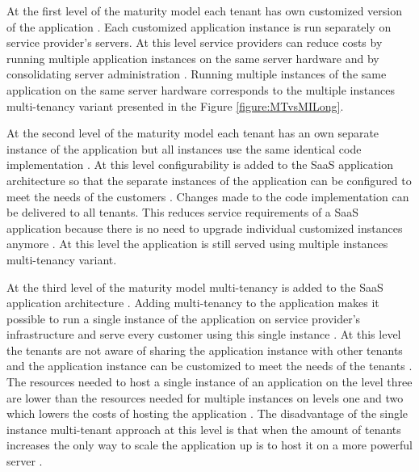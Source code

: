 \documentclass[conference]{sasmoota2017}
\begin{document}
At the first level of the maturity model each tenant has own customized version of the application \cite{Carraro:2006:ArchitectureLongTail}. Each customized application instance is run separately on service provider's servers. At this level service providers can reduce costs by running multiple application instances on the same server hardware and by consolidating server administration \cite{Carraro:2006:ArchitectureLongTail}. Running multiple instances of the same application on the same server hardware corresponds to the multiple instances multi-tenancy variant presented in the Figure \ref{figure:MTvsMILong}. 

At the second level of the maturity model each tenant has an own separate instance of the application but all instances use the same identical code implementation \cite{Carraro:2006:ArchitectureLongTail}. At this level configurability is added to the SaaS application architecture so that the separate instances of the application can be configured to meet the needs of the customers \cite{Carraro:2006:ArchitectureLongTail}. Changes made to the code implementation can be delivered to all tenants. This reduces service requirements of a SaaS application because there is no need to upgrade individual customized instances anymore \cite{Carraro:2006:ArchitectureLongTail}. At this level the application is still served using multiple instances multi-tenancy variant.

At the third level of the maturity model multi-tenancy is added to the SaaS application architecture \cite{Carraro:2006:ArchitectureLongTail}. Adding multi-tenancy to the application makes it possible to run a single instance of the application on service provider's infrastructure and serve every customer using this single instance \cite{Carraro:2006:ArchitectureLongTail}. At this level the tenants are not aware of sharing the application instance with other tenants and the application instance can be customized to meet the needs of the tenants \cite{Carraro:2006:ArchitectureLongTail}. The resources needed to host a single instance of an application on the level three are lower than the resources needed for multiple instances on levels one and two which lowers the costs of hosting the application \cite{Carraro:2006:ArchitectureLongTail}. The disadvantage of the single instance multi-tenant approach at this level is that when the amount of tenants increases the only way to scale the application up is to host it on a more powerful server \cite{Carraro:2006:ArchitectureLongTail}. 
\end{document}
